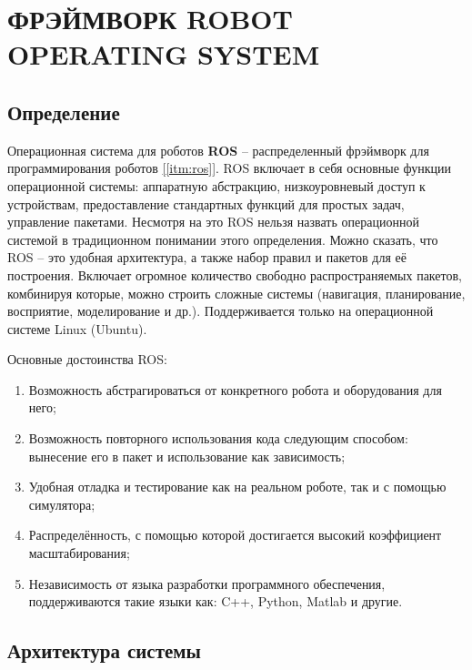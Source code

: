 \chapter{ФРЭЙМВОРК ROBOT OPERATING SYSTEM}

\section{Определение}

Операционная система для роботов \textbf{ROS} -- распределенный фрэймворк для программирования роботов \hyperref[itm:ros]{[\ref{itm:ros}]}. ROS включает в себя основные функции операционной системы: аппаратную абстракцию, низкоуровневый доступ к устройствам, предоставление стандартных функций для простых задач, управление пакетами. Несмотря на это ROS нельзя назвать операционной системой в традиционном понимании этого определения. Можно сказать, что ROS -- это удобная архитектура, а также набор правил и пакетов для её построения. Включает огромное количество свободно распространяемых пакетов, комбинируя которые, можно строить сложные системы (навигация, планирование, восприятие, моделирование и др.). Поддерживается только на операционной системе Linux (Ubuntu).

Основные достоинства ROS: 
\begin{enumerate}
    \item Возможность абстрагироваться от конкретного робота и оборудования для него;
    \item Возможность повторного использования кода следующим способом: вынесение его в пакет и использование как зависимость;
    \item Удобная отладка и тестирование как на реальном роботе, так и с помощью симулятора;
    \item Распределённость, с помощью которой достигается высокий коэффициент масштабирования;
    \item Независимость от языка разработки программного обеспечения, поддерживаются такие языки как: C++, Python, Matlab и другие.
\end{enumerate}

\section{Архитектура системы}

